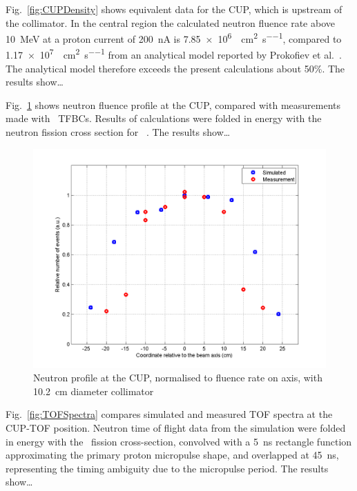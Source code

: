 \documentclass[11pt,a4paper]{IEEEtran}
\let\MYoriglatexcaption\caption
\renewcommand{\caption}[2][\relax]{\MYoriglatexcaption[#2]{#2}}
\def\U238{\BPChem{\^{238}U}}
\begin{document}
Fig.~\ref{fig:CUPDensity} shows equivalent data for the CUP, which is upstream of the collimator.
In the central region the calculated neutron fluence rate above \SI{10}{\MeV} at a proton current of \SI{200}{\nA} is \SI{7.85e6}{\neutron\per\cm\squared\per\second}, compared to \SI{1.17e7}{\neutron\per\cm\squared\per\second} from an analytical model reported by Prokofiev et al.~\cite{Prokofiev2014}.
The analytical model therefore exceeds the present calculations about 50\%.
The results show\ldots
{}

Fig.~\ref{fig:CUPProfile} shows neutron fluence profile at the CUP, compared with measurements made with \U238\ TFBCs.
Results of calculations were folded in energy with the neutron fission cross section for \U238~\cite{Carlson2009}.
The results show\ldots
{}

\begin{figure}[t]
    \centering
    \includegraphics[width=\columnwidth]{CUPTOF10beamproRADECS.png}
    \caption{
        Neutron profile at the CUP, normalised to fluence rate on axis, with
        \SI{10.2}{\cm} diameter collimator}
    \label{fig:CUPProfile}
\end{figure}

Fig.~\ref{fig:TOFSpectra} compares simulated and measured TOF spectra at the CUP-TOF position.
Neutron time of flight data from the simulation were folded in energy with the \U238\ fission cross-section, convolved with a \SI{5}{\ns} rectangle function approximating the primary proton micropulse shape, and overlapped at \SI{45}{\ns}, representing the timing ambiguity due to the micropulse period.
The results show\ldots
{}
\end{document}
